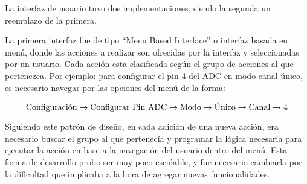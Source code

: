 
La interfaz de usuario tuvo dos implementaciones, siendo la segunda un reemplazo de la primera.

La primera interfaz fue de tipo ``Menu Based Interface'' o interfaz basada en menú, donde las acciones a realizar son ofrecidas por la interfaz y seleccionadas por un usuario. Cada acción esta clasificada según el grupo de acciones al que pertenezca. Por ejemplo: para configurar el pin 4 del ADC en modo canal único, es necesario navegar por las opciones del menú de la forma: 

\begin{equation}
\noindent
\text{Configuración} \rightarrow \text{Configurar Pin ADC} \rightarrow \text{Modo} \rightarrow \text{Único} \rightarrow \text{Canal} \rightarrow \text{4} 
\end{equation}



Siguiendo este patrón de diseño, en cada adición de una nueva acción, era necesario buscar el grupo al que pertenecía y programar la lógica necesaria para ejecutar la acción en base a la navegación del usuario dentro del menú. Esta forma de desarrollo probo ser muy poco escalable, y fue necesario cambiarla por la dificultad que implicaba a la hora de agregar nuevas funcionalidades. \\


